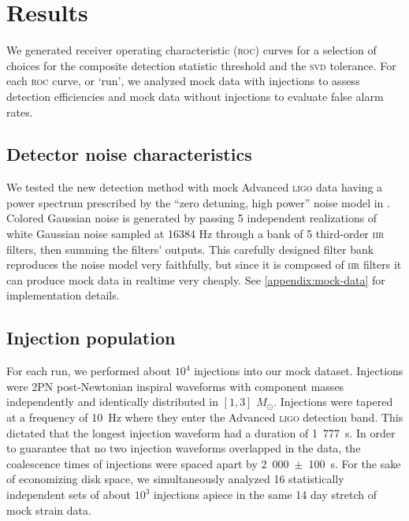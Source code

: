 \section{Results}
\label{SECIV}\label{sec:results}

We generated receiver operating characteristic (\textsc{roc}) curves for a selection of choices for the composite detection statistic threshold and the \textsc{svd} tolerance.  For each \textsc{roc} curve, or `run', we analyzed mock data with injections to assess detection efficiencies and mock data without injections to evaluate false alarm rates.

\subsection{Detector noise characteristics}

We tested the new detection method with mock Advanced \textsc{ligo} data having a power spectrum prescribed by the ``zero detuning, high power'' noise model in \cite{Shoemaker:2009p9770}.  Colored Gaussian noise is generated by passing 5 independent realizations of white Gaussian noise sampled at 16384 Hz through a bank of 5 third-order \textsc{iir} filters, then summing the filters' outputs.  This carefully designed filter bank reproduces the noise model very faithfully, but since it is composed of \textsc{iir} filters it can produce mock data in realtime very cheaply.  See \ref{appendix:mock-data} for implementation details. 

\subsection{Injection population}

For each run, we performed about $10^4$ injections into our mock dataset.  Injections were 2PN post-Newtonian inspiral waveforms with component masses independently and identically distributed in $[1, 3]$ $M_\odot$.  Injections were tapered  at a frequency of 10~Hz where they enter the Advanced \textsc{ligo} detection band.  This dictated that the longest injection waveform had a duration of {\color{red} 1~777~s}.  In order to guarantee that no two injection waveforms overlapped in the data, the coalescence times of injections were spaced apart by {\color{red} 2~000~$\pm$~100~s}.  For the sake of economizing disk space, we simultaneously analyzed {\color{red} 16 statistically independent sets} of about $10^3$ injections apiece in the same {\color{red} 14 day} stretch of mock strain data.

